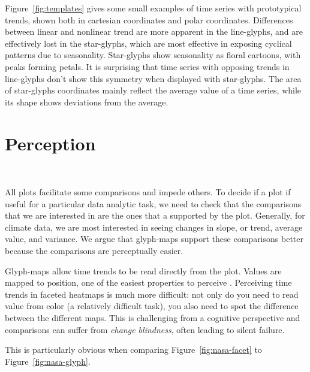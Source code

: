 \documentclass[oneside]{article}
\begin{document}
Figure~\ref{fig:templates} gives some small examples of time series with prototypical trends, shown both in cartesian coordinates and polar coordinates. Differences between linear and nonlinear trend are more apparent in the line-glyphs, and are effectively lost in the star-glyphs, which are most effective in exposing cyclical patterns due to seasonality. Star-glyphs show seasonality as floral cartoons, with peaks forming petals. It is surprising that time series with opposing trends in line-glyphs don't show this symmetry when displayed with star-glyphs. The area of star-glyphs coordinates mainly reflect the average value of a time series, while its shape shows deviations from the average.

\section{Perception}~\label{sec:perception}

All plots facilitate some comparisons and impede others. To decide if a plot if useful for a particular data analytic task, we need to check that the comparisons that we are interested in are the ones that a supported by the plot. Generally, for climate data, we are most interested in seeing changes in slope, or trend, average value, and variance. We argue that glyph-maps support these comparisons better because the comparisons are perceptually easier.

Glyph-maps allow time trends to be read directly from the plot. Values are mapped to position, one of the easiest properties to perceive \citep{cleveland:1984}. Perceiving time trends in faceted heatmaps is much more difficult: not only do you need to read value from color (a relatively difficult task), you also need to spot the difference between the different maps. This is challenging from a cognitive perspective \citep{healey:2011,busey} and comparisons can suffer from \emph{change blindness}, often leading to silent failure. 

This is particularly obvious when comparing Figure~\ref{fig:nasa-facet} to Figure~\ref{fig:nasa-glyph}.

\end{document}
